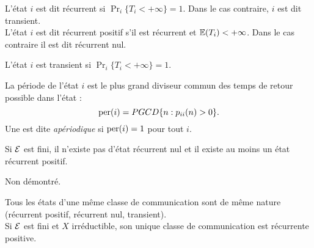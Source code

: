 \begin{definition*}
  L'état $i$ est dit récurrent si $\Pr_i\{T_i < + \infty\} = 1$. Dans le cas contraire, $i$ est dit transient. \\
  L'état $i$ est dit récurrent positif s'il est récurrent et $\operatorname{\mathbb{E}}(T_i) < + \infty$. Dans le cas contraire il est dit récurrent nul.
\end{definition*}

\begin{definition*}
  L'état $i$ est transient si $\Pr_i\{T_i < + \infty\} = 1$.
\end{definition*}

\begin{definition*}
  La période de l'état $i$ est le plus grand diviseur commun des temps de retour possible dans l'état :
  $$
  \text{per}(i) = PGCD\{n: p_{ii}(n) > 0\}.
  $$
  Une \cM est dite {\em apériodique} si $\text{per}(i) = 1$ pour tout $i$.
\end{definition*}


\begin{proposition*}
  Si $\mathcal{E}$ est fini, il n'existe pas d'état récurrent nul et il existe au moins un état récurrent positif.
\end{proposition*}

\proof Non démontré. \eproof

\begin{proposition*}
  Tous les états d'une même classe de communication sont de même nature (récurrent positif, récurrent nul, transient). \\
  Si $\mathcal{E}$ est fini et $X$ irréductible, son unique classe de communication est récurrente positive.
\end{proposition*}

